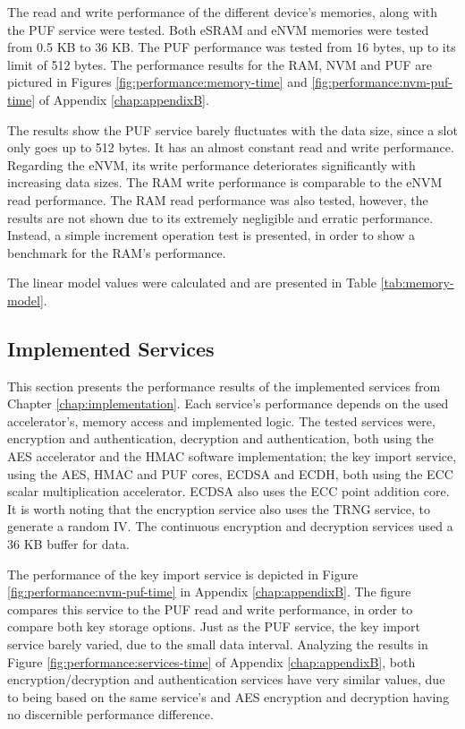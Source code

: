 The read and write performance of the different device's memories, along with the PUF service were tested. Both eSRAM and eNVM memories were tested from 0.5 KB to 36 KB. The PUF performance was tested from 16 bytes, up to its limit of 512 bytes.
The performance results for the RAM, NVM and PUF are pictured in Figures \ref{fig:performance:memory-time} and \ref{fig:performance:nvm-puf-time} of Appendix \ref{chap:appendixB}.

The results show the PUF service barely fluctuates with the data size, since a slot only goes up to 512 bytes. It has an almost constant read and write performance.
Regarding the eNVM, its write performance deteriorates significantly with increasing data sizes.
The RAM write performance is comparable to the eNVM read performance. The RAM read performance was also tested, however, the results are not shown due to its extremely negligible and erratic performance. Instead, a simple increment operation test is presented, in order to show a benchmark for the RAM's performance.

The linear model values were calculated and are presented in Table \ref{tab:memory-model}.



\subsection{Implemented Services}\label{chap:evaluation:services}

This section presents the performance results of the implemented services from Chapter \ref{chap:implementation}. Each service's performance depends on the used accelerator's, memory access and implemented logic.
The tested services were, encryption and authentication, decryption and authentication, both using the AES accelerator and the HMAC software implementation; the key import service, using the AES, HMAC and PUF cores, ECDSA and ECDH, both using the ECC scalar multiplication accelerator. ECDSA also uses the ECC point addition core. It is worth noting that the encryption service also uses the TRNG service, to generate a random IV. 
The continuous encryption and decryption services used a 36 KB buffer for data.

The performance of the key import service is depicted in Figure \ref{fig:performance:nvm-puf-time} in Appendix \ref{chap:appendixB}. The figure compares this service to the PUF read and write performance, in order to compare both key storage options.
Just as the PUF service, the key import service barely varied, due to the small data interval.
Analyzing the results in Figure	\ref{fig:performance:services-time} of Appendix	\ref{chap:appendixB}, both encryption/decryption and authentication services have very similar values, due to being based on the same service's and AES encryption and decryption having no discernible performance difference.

